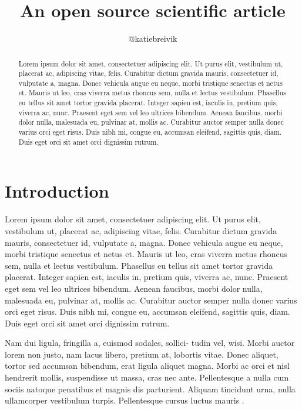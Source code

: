 \documentclass[twocolumn]{aastex631}
\begin{document}
\title{An open source scientific article}

\author{@katiebreivik}

\begin{abstract}
    Lorem ipsum dolor sit amet, consectetuer adipiscing elit. 
    Ut purus elit, vestibulum ut, placerat ac, adipiscing vitae, felis. 
    Curabitur dictum gravida mauris, consectetuer id, vulputate a, magna. 
    Donec vehicula augue eu neque, morbi tristique senectus et netus et. 
    Mauris ut leo, cras viverra metus rhoncus sem, nulla et lectus vestibulum. 
    Phasellus eu tellus sit amet tortor gravida placerat. 
    Integer sapien est, iaculis in, pretium quis, viverra ac, nunc. 
    Praesent eget sem vel leo ultrices bibendum. 
    Aenean faucibus, morbi dolor nulla, malesuada eu, pulvinar at, mollis ac. 
    Curabitur auctor semper nulla donec varius orci eget risus. 
    Duis nibh mi, congue eu, accumsan eleifend, sagittis quis, diam. 
    Duis eget orci sit amet orci dignissim rutrum.
\end{abstract}

\section{Introduction}
\label{sec:intro}

Lorem ipsum dolor sit amet, consectetuer adipiscing elit. 
Ut purus elit, vestibulum ut, placerat ac, adipiscing vitae, felis. 
Curabitur dictum gravida mauris, consectetuer id, vulputate a, magna. 
Donec vehicula augue eu neque, morbi tristique senectus et netus et. 
Mauris ut leo, cras viverra metus rhoncus sem, nulla et lectus vestibulum. 
Phasellus eu tellus sit amet tortor gravida placerat. 
Integer sapien est, iaculis in, pretium quis, viverra ac, nunc. 
Praesent eget sem vel leo ultrices bibendum. 
Aenean faucibus, morbi dolor nulla, malesuada eu, pulvinar at, mollis ac. 
Curabitur auctor semper nulla donec varius orci eget risus. 
Duis nibh mi, congue eu, accumsan eleifend, sagittis quis, diam. 
Duis eget orci sit amet orci dignissim rutrum.

Nam dui ligula, fringilla a, euismod sodales, sollici- tudin vel, wisi. 
Morbi auctor lorem non justo, nam lacus libero, pretium at, lobortis vitae. 
Donec aliquet, tortor sed accumsan bibendum, erat ligula aliquet magna. 
Morbi ac orci et nisl hendrerit mollis, suspendisse ut massa, cras nec ante. 
Pellentesque a nulla cum sociis natoque penatibus et magnis dis parturient. 
Aliquam tincidunt urna, nulla ullamcorper vestibulum turpis. 
Pellentesque cursus luctus mauris \citep{Luger2021}.


\end{document}
